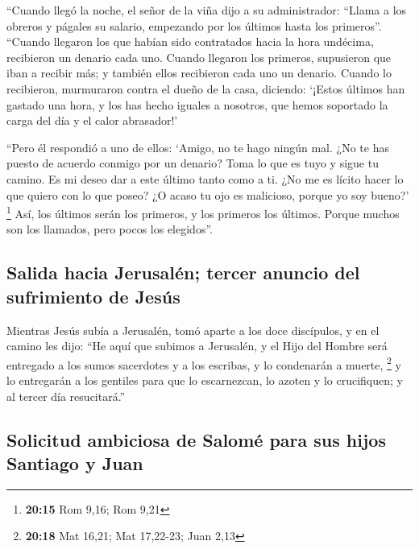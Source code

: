  ``Cuando llegó la noche, el señor de la viña dijo a su
administrador: ``Llama a los obreros y págales su salario, empezando por
los últimos hasta los primeros''.  ``Cuando llegaron los
que habían sido contratados hacia la hora undécima, recibieron un
denario cada uno.  Cuando llegaron los primeros,
supusieron que iban a recibir más; y también ellos recibieron cada uno
un denario.  Cuando lo recibieron, murmuraron contra el
dueño de la casa,  diciendo: `¡Estos últimos han gastado
una hora, y los has hecho iguales a nosotros, que hemos soportado la
carga del día y el calor abrasador!'

 ``Pero él respondió a uno de ellos: `Amigo, no te hago
ningún mal. ¿No te has puesto de acuerdo conmigo por un denario?
 Toma lo que es tuyo y sigue tu camino. Es mi deseo dar a
este último tanto como a ti.  ¿No me es lícito hacer lo
que quiero con lo que poseo? ¿O acaso tu ojo es malicioso, porque yo soy
bueno?' \footnote{\textbf{20:15} Rom 9,16; Rom 9,21} 
Así, los últimos serán los primeros, y los primeros los últimos. Porque
muchos son los llamados, pero pocos los elegidos''.

\hypertarget{salida-hacia-jerusaluxe9n-tercer-anuncio-del-sufrimiento-de-jesuxfas}{%
\subsection{Salida hacia Jerusalén; tercer anuncio del sufrimiento de
Jesús}\label{salida-hacia-jerusaluxe9n-tercer-anuncio-del-sufrimiento-de-jesuxfas}}

 Mientras Jesús subía a Jerusalén, tomó aparte a los doce
discípulos, y en el camino les dijo:  ``He aquí que
subimos a Jerusalén, y el Hijo del Hombre será entregado a los sumos
sacerdotes y a los escribas, y lo condenarán a muerte, \footnote{\textbf{20:18}
  Mat 16,21; Mat 17,22-23; Juan 2,13}  y lo entregarán a
los gentiles para que lo escarnezcan, lo azoten y lo crucifiquen; y al
tercer día resucitará.''

\hypertarget{solicitud-ambiciosa-de-salomuxe9-para-sus-hijos-santiago-y-juan}{%
\subsection{Solicitud ambiciosa de Salomé para sus hijos Santiago y
Juan}\label{solicitud-ambiciosa-de-salomuxe9-para-sus-hijos-santiago-y-juan}}

